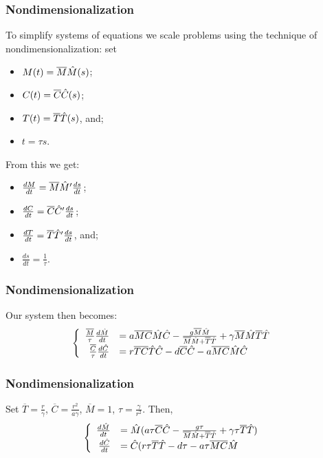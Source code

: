 \begin{frame}
  \frametitle{Nondimensionalization}
  \hspace{1.57em}To simplify systems of equations we scale problems using the technique of nondimensionalization: set {\begin{itemize}\itemsep0pt\item $M(t)=\overline{M}\HAT{M}(s)$;\\\item $C(t)=\overline{C}\HAT{C}(s)$;\\\item $T(t)=\overline{T}\HAT{T}(s)$, and;\\\item $t=\tau s$. \end{itemize} From this we get: \begin{itemize}\itemsep0pt \item$\frac{dM}{dt}=\overline{M}\HAT{M}'\frac{ds}{dt}$;\\\item $\frac{dC}{dt}=\overline{C}\HAT{C}'\frac{ds}{dt}$;\\\item $\frac{dT}{dt}=\overline{T}\HAT{T}'\frac{ds}{dt}$, and;\\ \item $\frac{ds}{dt}=\frac{1}{\tau}.$\end{itemize} }
  \end{frame}
 \begin{frame}
  \frametitle{Nondimensionalization}Our system then becomes: $$\begin{cases} 
\begin{array}{rl}
\frac{\overline{M}}{\tau}\frac{d\HAT{M}}{dt}&= a\overline{M}\overline{C}\HAT{M}\HAT{C}-\frac{g\overline{M}\HAT{M}}{\overline{M}\HAT{M}+\overline{T}\HAT{T}} + \gamma \overline{M}\HAT{M}\overline{T}\HAT{T}\\ 
\frac{\overline{C}}{\tau}\frac{d\HAT{C}}{dt}&=r\overline{T}\overline{C}\HAT{T}\HAT{C}-d\overline{C}\HAT{C}-a\overline{M}\overline{C}\HAT{M}\HAT{C}
\end{array} \end{cases}$$
\end{frame}

{\center
\begin{frame}\frametitle{Nondimensionalization}Set $\overline{T}=\frac{r}{\gamma}$, $\overline{C}=\frac{r^2}{a\gamma}$, $\overline{M}=1$, $\tau=\frac{\gamma}{r^2}$. Then, $$\begin{cases}
\begin{array}{rl}
\frac{d\HAT{M}}{dt}&= \HAT{M}(a\tau\overline{C}\HAT{C}-\frac{g\tau}{\overline{M}\HAT{M}+\overline{T}\HAT{T}} + \gamma \tau\overline{T}\HAT{T})\\ 
\frac{d\HAT{C}}{dt}&=\HAT{C}(r\tau\overline{T}\HAT{T}-d\tau-a\tau\overline{M}\overline{C}\HAT{M}
\end{array} \end{cases}$$ 
\end{frame}
}

